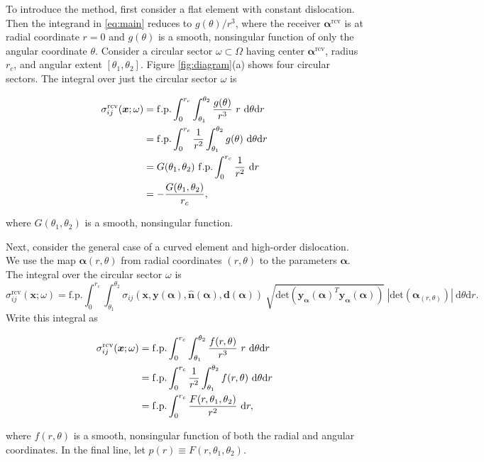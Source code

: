 \documentclass[11pt]{article}
\renewcommand{\vec}[1]{\boldsymbol{#1}}
\newcommand{\uvec}[1]{\hat{\boldsymbol{#1}}}
\newcommand{\rmax}{r_c}
\newcommand{\suprcv}[1]{#1^{\mathrm{rcv}}}
\begin{document}
To introduce the method,
first consider a flat element with constant dislocation.
Then the integrand in \eqref{eq:main} reduces to
$g(\theta)/r^3$,
where the receiver $\suprcv{\vec{\alpha}}$ is at radial coordinate $r = 0$
and $g(\theta)$ is a smooth, nonsingular function of only the angular coordinate $\theta$.
Consider a circular sector $\omega \subset \Omega$
having center $\suprcv{\vec{\alpha}}$,
radius $\rmax$,
and angular extent $[\theta_1,\theta_2]$.
Figure \ref{fig:diagram}(a) shows four circular sectors.
The integral over just the circular sector $\omega$ is
\begin{linenomath}\begin{align}
  \sigma_{ij}^\mathrm{rcv}(\vec{x}; \omega) &=
    \mathrm{f.p.} \int_0^{\rmax} \int_{\theta_1}^{\theta_2}
    \frac{g(\theta)}{r^3} \
    r \ \mathrm{d} \theta \mathrm{d} r \notag \\
  &= \mathrm{f.p.} \int_0^{\rmax} \frac{1}{r^2}
     \int_{\theta_1}^{\theta_2} g(\theta) \ \mathrm{d} \theta \mathrm{d} r \notag \\
  &= G(\theta_1,\theta_2) \ \mathrm{f.p.} \int_0^{\rmax} \frac{1}{r^2} \ \mathrm{d} r \notag \\
  &= -\frac{G(\theta_1,\theta_2)}{\rmax}, \label{eq:flatconst-case}
\end{align}\end{linenomath}
where $G(\theta_1,\theta_2)$ is a smooth, nonsingular function.

Next, consider the general case of a curved element and high-order dislocation.
We use the map $\vec{\alpha}(r,\theta)$ from radial coordinates $(r,\theta)$ to the parameters $\vec{\alpha}$.
The integral over the circular sector $\omega$ is
\begin{equation} \label{eq:general-integral}
  \sigma_{ij}^\mathrm{rcv}(\vec{x}; \omega) =
  \mathrm{f.p.} \int_0^{\rmax} \int_{\theta_1}^{\theta_2}
    \sigma_{ij}(\vec{x}, \vec{y}(\vec{\alpha}), \uvec{n}(\vec{\alpha}), \vec{d}(\vec{\alpha})) \
    \sqrt{\mathrm{det}(\vec{y}_{\vec{\alpha}}(\vec{\alpha})^T \vec{y}_{\vec{\alpha}}(\vec{\alpha}))} \
    | \mathrm{det}(\vec{\alpha}_{(r,\theta)}) | \
    \mathrm{d} \theta \mathrm{d} r.
\end{equation}
Write this integral as
\begin{linenomath}\begin{align}
  \sigma_{ij}^\mathrm{rcv}(\vec{x}; \omega) &=
  \mathrm{f.p.} \int_0^{\rmax} \int_{\theta_1}^{\theta_2}
    \frac{f(r,\theta)}{r^3} \
    r \ \mathrm{d} \theta \mathrm{d} r \notag \\
  &= \mathrm{f.p.} \int_0^{\rmax} \frac{1}{r^2}
    \int_{\theta_1}^{\theta_2} f(r,\theta) \ \mathrm{d} \theta
    \mathrm{d} r \notag \\
  &= \mathrm{f.p.} \int_0^{\rmax} \frac{F(r,\theta_1,\theta_2)}{r^2} \
    \mathrm{d} r, \label{eq:general-case}
\end{align}\end{linenomath}
where $f(r,\theta)$ is a smooth, nonsingular function of both the radial and angular coordinates.
In the final line, let $p(r) \equiv F(r,\theta_1,\theta_2)$.
\end{document}
